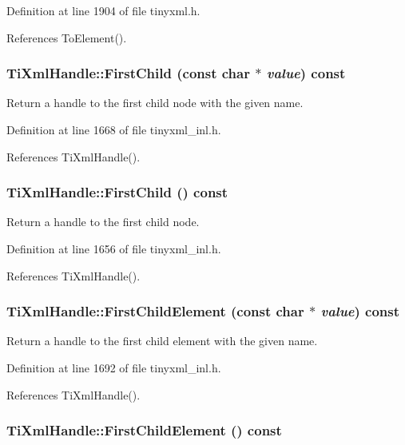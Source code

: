 Definition at line 1904 of file tinyxml.h.

References ToElement().\hypertarget{class_ti_xml_handle_a8c61f64ae9365d89c264f289085541f8}{
\subsubsection[{FirstChild}]{ TiXmlHandle::FirstChild (const char $\ast$ {\em value}) const}}
\label{class_ti_xml_handle_a8c61f64ae9365d89c264f289085541f8}


Return a handle to the first child node with the given name. 

Definition at line 1668 of file tinyxml\_\-inl.h.

References TiXmlHandle().\hypertarget{class_ti_xml_handle_acdb1faaf88a700b40ca2c8d9aee21139}{
\subsubsection[{FirstChild}]{ TiXmlHandle::FirstChild () const}}
\label{class_ti_xml_handle_acdb1faaf88a700b40ca2c8d9aee21139}


Return a handle to the first child node. 

Definition at line 1656 of file tinyxml\_\-inl.h.

References TiXmlHandle().\hypertarget{class_ti_xml_handle_af0aea751320f5e430fac6f8fff3b8dd4}{
\subsubsection[{FirstChildElement}]{ TiXmlHandle::FirstChildElement (const char $\ast$ {\em value}) const}}
\label{class_ti_xml_handle_af0aea751320f5e430fac6f8fff3b8dd4}


Return a handle to the first child element with the given name. 

Definition at line 1692 of file tinyxml\_\-inl.h.

References TiXmlHandle().\hypertarget{class_ti_xml_handle_a24d1112e995e937e4dddb202d4113d4a}{
\subsubsection[{FirstChildElement}]{ TiXmlHandle::FirstChildElement () const}}
\label{class_ti_xml_handle_a24d1112e995e937e4dddb202d4113d4a}


